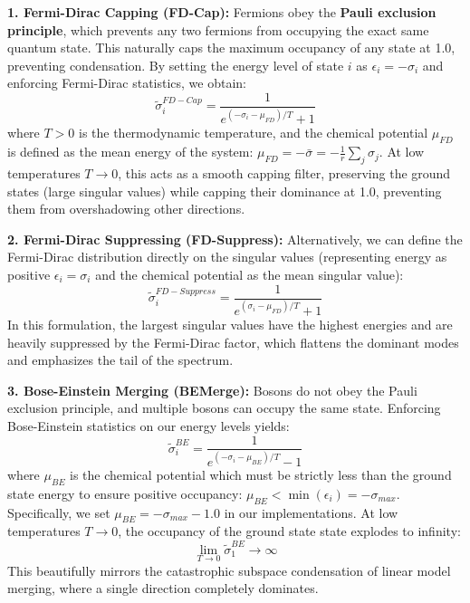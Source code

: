 \documentclass{article}
\theoremstyle{plain}
\theoremstyle{definition}
\theoremstyle{remark}
\begin{document}
\textbf{1. Fermi-Dirac Capping (FD-Cap):}
Fermions obey the \textbf{Pauli exclusion principle}, which prevents any two fermions from occupying the exact same quantum state. This naturally caps the maximum occupancy of any state at 1.0, preventing condensation.
By setting the energy level of state $i$ as $\epsilon_i = -\sigma_i$ and enforcing Fermi-Dirac statistics, we obtain:
\begin{equation}
    \tilde{\sigma}_i^{FD-Cap} = \frac{1}{e^{(-\sigma_i - \mu_{FD})/T} + 1}
\end{equation}
where $T > 0$ is the thermodynamic temperature, and the chemical potential $\mu_{FD}$ is defined as the mean energy of the system: $\mu_{FD} = -\bar{\sigma} = -\frac{1}{r} \sum_j \sigma_j$.
At low temperatures $T \to 0$, this acts as a smooth capping filter, preserving the ground states (large singular values) while capping their dominance at 1.0, preventing them from overshadowing other directions.

\textbf{2. Fermi-Dirac Suppressing (FD-Suppress):}
Alternatively, we can define the Fermi-Dirac distribution directly on the singular values (representing energy as positive $\epsilon_i = \sigma_i$ and the chemical potential as the mean singular value):
\begin{equation}
    \tilde{\sigma}_i^{FD-Suppress} = \frac{1}{e^{(\sigma_i - \mu_{FD})/T} + 1}
\end{equation}
In this formulation, the largest singular values have the highest energies and are heavily suppressed by the Fermi-Dirac factor, which flattens the dominant modes and emphasizes the tail of the spectrum.

\textbf{3. Bose-Einstein Merging (BEMerge):}
Bosons do not obey the Pauli exclusion principle, and multiple bosons can occupy the same state. Enforcing Bose-Einstein statistics on our energy levels yields:
\begin{equation}
    \tilde{\sigma}_i^{BE} = \frac{1}{e^{(-\sigma_i - \mu_{BE})/T} - 1}
\end{equation}
where $\mu_{BE}$ is the chemical potential which must be strictly less than the ground state energy to ensure positive occupancy: $\mu_{BE} < \min(\epsilon_i) = -\sigma_{max}$. Specifically, we set $\mu_{BE} = -\sigma_{max} - 1.0$ in our implementations.
At low temperatures $T \to 0$, the occupancy of the ground state state explodes to infinity:
\begin{equation}
    \lim_{T \to 0} \tilde{\sigma}_1^{BE} \to \infty
\end{equation}
This beautifully mirrors the catastrophic subspace condensation of linear model merging, where a single direction completely dominates.
\end{document}

